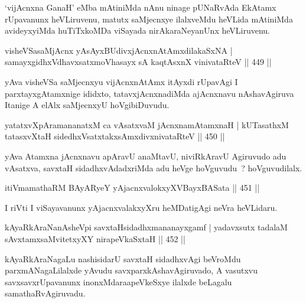 \begin{artha}
`vijAcnxna GanaH' eMba mAtiniMda nAnu ninage pUNaRvAda EkAtamx rUpavanunx heVLiruvenu, matutx saMjecnxye ilalxveMdu heVLida mAtiniMda avideyxyiMda huTiTxkoMDa viSayada nirAkaraNeyanUnx heVLiruvenu.
\end{artha}

\begin{shl}
visheVSasaMjAcnx yA\s sAyxBUdivxjAcnxnAtAmxdilakaSxNA |
samayxgidhxVdhavxsatxmoVhasayx sA kaqtAsxnX vinivataRteV \hfill || 449 ||
\end{shl}

\begin{artha}
yAva visheVSa saMjecnxyu vijAcnxnAtAmx itAyxdi rUpavAgi I parxtayxgAtamxnige ididxto, tatavxjAcnxnadiMda ajAcnxnavu nAshavAgiruva Itanige A elAlx saMjecnxyU hoVgibiDuvudu.
\end{artha}

\begin{shl}
yatatxvXpAramananatxM ca vAsatxvaM jAcnxnamAtamxnaH |
kUTasathxM tatasxvXtaH sidedhxVsatxtakxsAmxdivxnivataRteV \hfill || 450 ||
\end{shl}

\begin{artha}
yAva Atamxna jAcnxnavu apAravU anaMtavU, niviRkAravU Agiruvudo adu vAsatxva, savxtaH sidadhxvAdadxriMda adu heVge hoVguvudu~? hoVguvudilalx.
\end{artha}

\begin{shl}
itiVmamathaRM BAyARyeY yAjacnxvalokxyXV\s BayxBASata \hfill || 451 ||
\end{shl}

\begin{artha}
I riVti I viSayavanunx yAjacnxvalakxyXru heMDatigAgi neVra heVLidaru.
\end{artha}

\begin{shl}
kAyaRkAraNanAsheV\s pi savxtaHsidadhxmananayxgamf |
yadavxsutx tadalaM sAvxtamxsaMvitetxyXY nirapeVkaSxtaH \hfill || 452 ||
\end{shl}

\begin{artha}
kAyaRkAraNagaLu nashisidarU savxtaH sidadhxvAgi beVroMdu parxmANagaLilalxde yAvudu savxparxkAshavAgiruvado, A vasutxvu savxsavxrUpavanunx inonxMdara\break apeVkeSxye ilalxde beLagalu samathaRvAgiruvadu.
\end{artha}



